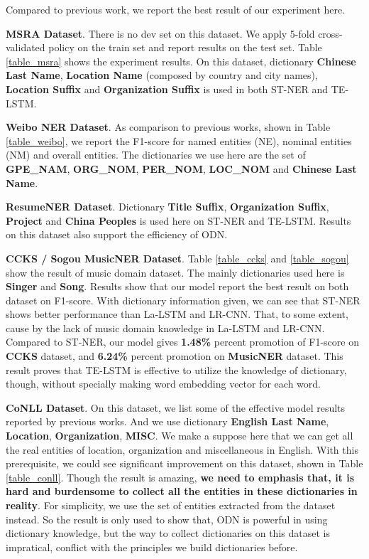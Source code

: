 \documentclass[letterpaper]{article} %
\begin{document}
Compared to previous work, we report the best result of our experiment here.

\textbf{MSRA Dataset}. There is no dev set on this dataset. We apply 5-fold cross-validated policy on the train set and report results on the test set. Table \ref{table_msra} shows the experiment results. On this dataset, dictionary \textbf{Chinese Last Name}, \textbf{Location Name} (composed by country and city names), \textbf{Location Suffix} and \textbf{Organization Suffix} is used in both ST-NER and TE-LSTM. 

\textbf{Weibo NER Dataset}. As comparison to previous works, shown in Table \ref{table_weibo}, we report the F1-score for named entities (NE), nominal  entities (NM) and overall entities. The dictionaries we use here are the set of \textbf{GPE\_NAM}, \textbf{ORG\_NOM}, \textbf{PER\_NOM}, \textbf{LOC\_NOM} and \textbf{Chinese Last Name}. 

\textbf{ResumeNER Dataset}. Dictionary \textbf{Title Suffix}, \textbf{Organization Suffix}, \textbf{Project} and \textbf{China Peoples} is used here on ST-NER and TE-LSTM. Results on this dataset also support the efficiency of ODN.

\textbf{CCKS / Sogou MusicNER Dataset}. Table \ref{table_ccks} and \ref{table_sogou} show the result of music domain dataset. The mainly dictionaries used here is \textbf{Singer} and \textbf{Song}. Results show that our model report the best result on both dataset on F1-score. With dictionary information given, we can see that ST-NER shows better performance than La-LSTM and LR-CNN. That, to some extent, cause by the lack of music domain knowledge in La-LSTM and LR-CNN. Compared to ST-NER, our model gives \textbf{1.48\%} percent promotion of F1-score on \textbf{CCKS} dataset, and \textbf{6.24\%} percent promotion on \textbf{MusicNER} dataset. This result proves that TE-LSTM is effective to utilize the knowledge of dictionary, though, without specially making word embedding vector for each word.

\textbf{CoNLL Dataset}. On this dataset, we list some of the effective model results reported by previous works. And we use dictionary \textbf{English Last Name}, \textbf{Location}, \textbf{Organization}, \textbf{MISC}. We make a suppose here that we can get all the real entities of location, organization and miscellaneous in English. With this prerequisite, we could see significant improvement on this dataset, shown in Table \ref{table_conll}. Though the result is amazing, \textbf{we need to emphasis that, it is hard and burdensome to collect all the entities in these dictionaries in reality}. For simplicity, we use the set of entities extracted from the dataset instead. So the result is only used to show that, ODN is powerful in using dictionary knowledge, but the way to collect dictionaries on this dataset is impratical, conflict with the principles we build dictionaries before.
\end{document}

